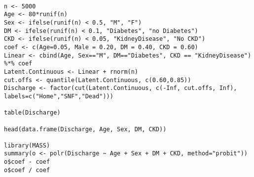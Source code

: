 \documentclass[12pt]{article}
\begin{document}
\begin{spacing}{1.0}
\begin{lstlisting}

n <- 5000
Age <- 80*runif(n)
Sex <- ifelse(runif(n) < 0.5, "M", "F")
DM <- ifelse(runif(n) < 0.1, "Diabetes", "no Diabetes")
CKD <- ifelse(runif(n) < 0.05, "KidneyDisease", "No CKD")
coef <- c(Age=0.05, Male = 0.20, DM = 0.40, CKD = 0.60) 
Linear <- cbind(Age, Sex=="M", DM=="Diabetes", CKD == "KidneyDisease") %*% coef
Latent.Continuous <- Linear + rnorm(n)
cut.offs <- quantile(Latent.Continuous, c(0.60,0.85))
Discharge <- factor(cut(Latent.Continuous, c(-Inf, cut.offs, Inf), labels=c("Home","SNF","Dead")))

table(Discharge)

head(data.frame(Discharge, Age, Sex, DM, CKD))

library(MASS)
summary(o <- polr(Discharge ~ Age + Sex + DM + CKD, method="probit"))
o$coef - coef
o$coef / coef

\end{lstlisting}
\end{spacing}
\end{document}

